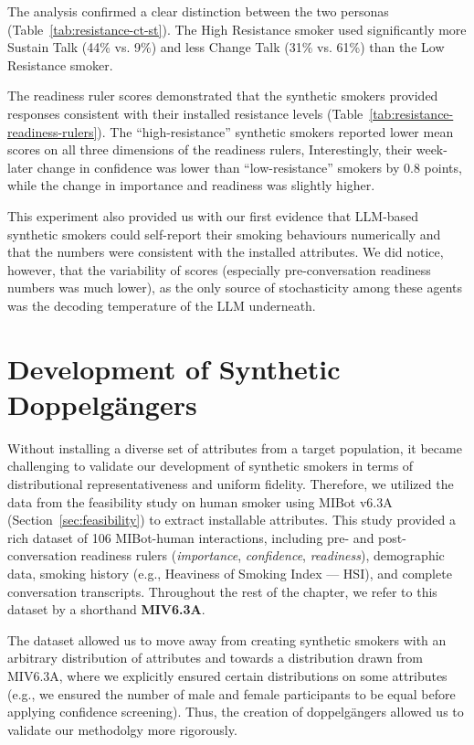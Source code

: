 The analysis confirmed a clear distinction between the two personas (Table~\ref{tab:resistance-ct-st}). The High Resistance smoker used significantly more Sustain Talk (44\% vs. 9\%) and less Change Talk (31\% vs. 61\%) than the Low Resistance smoker.


The readiness ruler scores demonstrated that the synthetic smokers provided responses consistent with their installed resistance levels (Table~\ref{tab:resistance-readiness-rulers}). The ``high-resistance'' synthetic smokers reported lower mean scores on all three dimensions of the readiness rulers, Interestingly, their week-later change in confidence was lower than ``low-resistance'' smokers by 0.8 points, while the change in importance and readiness was slightly higher.




This experiment also provided us with our first evidence that LLM-based synthetic smokers could self-report their smoking behaviours numerically and that the numbers were consistent with the installed attributes. We did notice, however, that the variability of scores (especially pre-conversation readiness numbers was much lower), as the only source of stochasticity among these agents was the decoding temperature of the LLM underneath.

\section{Development of Synthetic Doppelgängers}
\label{sec:synthetic-smoker-doppelgänger}

Without installing a diverse set of attributes from a target population, it became challenging to validate our development of synthetic smokers in terms of distributional representativeness and uniform fidelity. 
Therefore, we utilized the data from the feasibility study on human smoker using MIBot v6.3A (Section~\ref{sec:feasibility}) to extract installable attributes. This study provided a rich dataset of 106 MIBot-human interactions, including pre- and post-conversation readiness rulers (\emph{importance}, \emph{confidence}, \emph{readiness}), demographic data, smoking history (e.g., Heaviness of Smoking Index --- HSI), and complete conversation transcripts. Throughout the rest of the chapter, we refer to this dataset by a shorthand \textbf{MIV6.3A}.

The dataset allowed us to move away from creating synthetic smokers with an arbitrary distribution of attributes and towards a distribution drawn from MIV6.3A, where we explicitly ensured certain distributions on some attributes (e.g., we ensured the number of male and female participants to be equal before applying confidence screening). Thus, the creation of doppelgängers allowed us to validate our methodolgy more rigorously.


